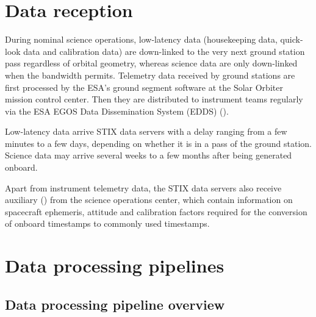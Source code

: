 \documentclass[referee]{aa} %
\begin{document}
\section{Data reception}

During nominal science operations, low-latency data (housekeeping data, quick-look data and calibration data)
are down-linked to 
the very next ground station pass regardless of orbital geometry, 
whereas science data are only down-linked when the bandwidth permits.
Telemetry data received by ground stations are first processed by the ESA's ground segment
software at the Solar Orbiter mission control center. 
Then they are distributed to instrument teams regularly via the ESA EGOS Data Dissemination System (EDDS) (\cite{EDDS}). 

Low-latency data arrive STIX data servers with a  delay ranging from 
a few minutes to a few days, depending on whether it is in a pass of the ground station. 
Science data may arrive several weeks to a few months after being generated onboard.

Apart from instrument telemetry data, the STIX data servers also receive
  auxiliary (\cite{spice1996,spice2018})  from the science operations center,
which contain information on spacecraft ephemeris, attitude and  
calibration factors required for the conversion of onboard timestamps 
to commonly used timestamps. 


\section{Data processing pipelines}
\subsection{Data processing pipeline overview}
\end{document}
